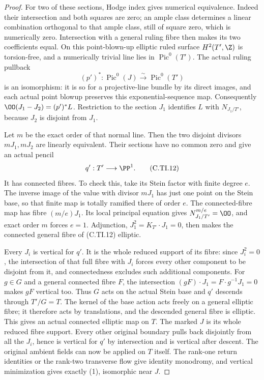 \begin{proof}
For two of these sections, Hodge index
gives numerical equivalence. Indeed their
intersection and both squares are zero;
an ample class determines a linear
combination orthogonal to that ample
class, still of square zero, which is
numerically zero. Intersection with a
general ruling fibre then makes its two
coefficients equal. On this point-blown-up
elliptic ruled surface \(H^2(T',\Z)\) is
torsion-free, and a numerically trivial
line lies in \(\operatorname{Pic}^0(T')\).
The actual ruling pullback
\[
        (p')^*:\operatorname{Pic}^0(J)
                       \xrightarrow{\sim}\operatorname{Pic}^0(T')
 \tag{C.TI.11}
\]
is an isomorphism: it is so for a
projective-line bundle by its direct
images, and each actual point blowup
preserves this exponential-sequence map.
Consequently
\(\OO(J_1-J_2)=(p')^*L\). Restriction to
the section \(J_1\) identifies \(L\)
with \(N_{J_1/T'}\), because \(J_2\)
is disjoint from \(J_1\).

Let \(m\) be the exact order of that
normal line. Then the two disjoint
divisors \(mJ_1,mJ_2\) are linearly
equivalent. Their sections have no
common zero and give an actual pencil
\[
                  q':T'\longrightarrow\PP^1.
 \tag{C.TI.12}
\]
It has connected fibres. To check this,
take its Stein factor with finite degree
\(e\). The inverse image of the value
with divisor \(mJ_1\) has just one
point on the Stein base, so that finite
map is totally ramified there of
order \(e\). The connected-fibre map
has fibre \((m/e)J_1\). Its local
principal equation gives
\(N_{J_1/T'}^{m/e}=\OO\), and exact
order \(m\) forces \(e=1\).
Adjunction, \(J_1^2=K_{T'}\cdot J_1=0\),
then makes the connected general fibre
of (C.TI.12) elliptic.

Every \(J_i\) is vertical for \(q'\).
It is the whole reduced support of
its fibre: since \(J_i^2=0\), the
intersection of that full fibre
with \(J_i\) forces every other
component to be disjoint from it,
and connectedness excludes such
additional components.
For \(g\in G\) and a general connected
fibre \(F\), the intersection
\((gF)\cdot J_1=F\cdot g^{-1}J_1=0\)
makes \(gF\) vertical too. Thus \(G\)
acts on the actual Stein base and
\(q'\) descends through \(T'/G=T\).
The kernel of the base action acts
freely on a general elliptic fibre;
it therefore acts by translations,
and the descended general fibre
is elliptic. This gives an actual
connected elliptic map on \(T\).
The marked \(J\) is its whole reduced
fibre support. Every other original
boundary pulls back disjointly from
all the \(J_i\), hence is vertical
for \(q'\) by intersection and is
vertical after descent. The original
ambient fields can now be applied
on \(T\) itself. The rank-one return
identities or the rank-two transverse
flow give identity monodromy, and
vertical minimization gives exactly
(1), isomorphic near \(J\).


\end{proof}
